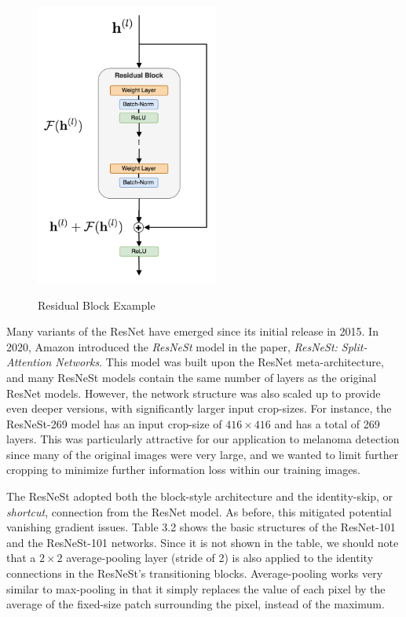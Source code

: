 \documentclass [MAS] {uclathes}
\begin{document}
\begin{figure}[h]
\centering
\includegraphics[height = 100mm, width= 60mm]{imgs/resblock.png}
\caption{Residual Block Example}
\label{fig:res_block}
\end{figure}

Many variants of the ResNet have emerged since its initial release in 2015. In 2020, Amazon introduced the \textit{ResNeSt} model in the paper, \textit{ResNeSt: Split-Attention Networks}. This model was built upon the ResNet meta-architecture, and many ResNeSt models contain the same number of layers as the original ResNet models. However, the network structure was also scaled up to provide even deeper versions, with significantly larger input crop-sizes. For instance, the ResNeSt-269 model has an input crop-size of $416 \times 416$ and has a total of 269 layers. This was particularly attractive for our application to melanoma detection since many of the original images were very large, and we wanted to limit further cropping to minimize further information loss within our training images.

The ResNeSt adopted both the block-style architecture and the identity-skip, or \textit{shortcut}, connection from the ResNet model. As before, this mitigated potential vanishing gradient issues. Table 3.2 shows the basic structures of the ResNet-101 and the ResNeSt-101 networks. Since it is not shown in the table, we should note that a $2 \times 2$ average-pooling layer (stride of 2) is also applied to the identity connections in the ResNeSt's transitioning blocks. Average-pooling works very similar to max-pooling in that it simply replaces the value of each pixel by the average of the fixed-size patch surrounding the pixel, instead of the maximum. 
\end{document}

